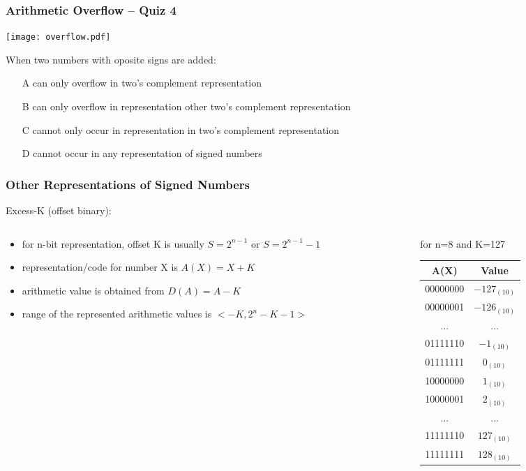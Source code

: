 \documentclass{beamer}
\begin{document}
\begin{frame}
\frametitle{Arithmetic Overflow -- Quiz 4}

\begin{center}
\texttt{[image: overflow.pdf]}
\end{center}

When two numbers with oposite signs are added:
\begin{itemize}
\item[A] can only overflow in two's complement representation
\item[B] can only overflow in representation other two's complement representation
\item[C] cannot only occur in representation in two's complement representation
\item[D] cannot occur in any representation of signed numbers
\end{itemize}
\end{frame}



\begin{frame}
\frametitle{Other Representations of Signed Numbers}

Excess-K (offset binary):

\begin{columns}
\begin{column}{0.5\textwidth}
\begin{itemize}
\item for n-bit representation, offset K is usually $S=2^{n-1}$ or $S=2^{n-1}-1$
\item representation/code for number X is $A(X) = X+K$
\item arithmetic value is obtained from $D(A) = A-K$
\item range of the represented arithmetic values is $<-K, 2^{n}-K-1>$
\end{itemize}
\end{column}
\hfill
\begin{column}{0.5\textwidth}
for n=8 and K=127
\bigskip
\begin{tabular}{|c|c|}\hline
{\small A(X)}  & {\small Value} \\\hline
00000000 & $-127_{(10)}$ \\ \hline
00000001 & $-126_{(10)}$ \\ \hline
... & ... \\\hline
01111110 & $-1_{(10)}$ \\ \hline
01111111 & $0_{(10)}$ \\ \hline
10000000 & $1_{(10)}$ \\ \hline
10000001 & $2_{(10)}$ \\ \hline
... & ... \\\hline
11111110 & $127_{(10)}$ \\ \hline
11111111 & $128_{(10)}$ \\ \hline
\end{tabular}
\end{column}
\end{columns}

\end{frame}
\end{document}
